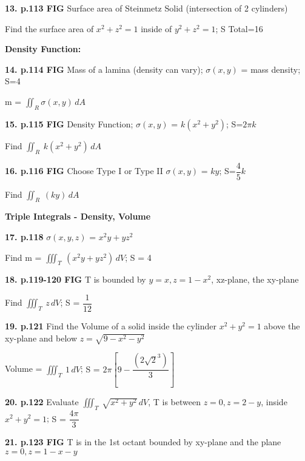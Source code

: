 \documentclass{article}
\begin{document}
\vspace{5mm}
\textbf{13. p.113 FIG} Surface area of Steinmetz Solid (intersection of 2 cylinders)

Find the surface area of \(x^2+z^2=1\) inside of \(y^2+z^2=1\); {\color{blue} S Total=16}

\vspace{15mm}
{\Large \textbf{Density Function:}}
    
\vspace{5mm}
\textbf{14. p.114 FIG} Mass of a lamina (density can vary); \(\sigma(x,y)\) = mass density; {\color{blue} S=4}

m = $\iint_R \sigma(x,y) \,dA$

\vspace{8mm}
\textbf{15. p.115 FIG} Density Function; \(\sigma(x,y)\) = \(k(x^2+y^2)\); {\color{blue} S=$2\pi k$}

Find $\iint_R \ k(x^2+y^2) \,dA$

\vspace{5mm}
\textbf{16. p.116 FIG} Choose Type I or Type II \(\sigma(x,y)\) = \(ky\); {\color{blue} S=$\dfrac{4}{5}k$}

Find $\iint_R \ (ky) \,dA$

\vspace{15mm}
{\Large \textbf{Triple Integrals - Density, Volume}}

\vspace{5mm}
\textbf{17. p.118} \(\sigma(x,y,z)\) = \(x^2y+yz^2\)

Find m = $\iiint_T \ (x^2y+yz^2) \,dV$;  {\color{blue}S = 4}

\vspace{5mm}
\textbf{18. p.119-120 FIG} T is bounded by \(y=x, z=1-x^2\), xz-plane, the xy-plane

Find $\iiint_T \ z \,dV$;  {\color{blue}S = $\dfrac{1}{12}$}

\vspace{5mm}
\textbf{19. p.121} Find the Volume of a solid inside the cylinder \(x^2+y^2=1\) above the xy-plane and below \(z=\sqrt{9-x^2-y^2}\)

Volume = $\iiint_T \ 1 \,dV$;  {\color{blue}S = $2\pi[9 - \dfrac{(2\sqrt{2}^3)}{3}]$}

\vspace{5mm}
\textbf{20. p.122} Evaluate $\iiint_T \ \sqrt{x^2+y^2} \,dV$, T is between $z=0, z=2-y$, inside $x^2+y^2=1$;  {\color{blue}S = $\dfrac{4\pi}{3}$}

\vspace{5mm}
\textbf{21. p.123 FIG} T is in the 1st octant bounded by xy-plane and the plane \(z=0, z=1-x-y\)  
\end{document}
